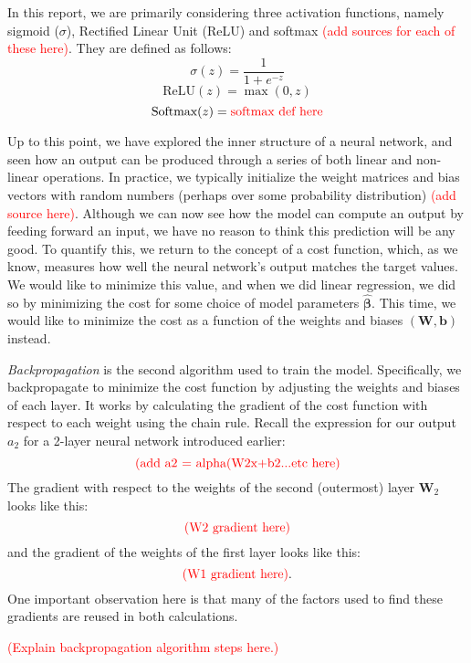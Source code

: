 In this report, we are primarily considering three activation functions, namely sigmoid ($\sigma$), Rectified Linear Unit (ReLU) and softmax \textcolor{red}{(add sources for each of these here)}. They are defined as follows:
\[\sigma(z) = \frac{1}{1 + e^{-z}}\]
\[\text{ReLU}(z) = \max(0, z)\]
\[\text{Softmax}(z) = \text{\textcolor{red}{softmax def here}}\]

Up to this point, we have explored the inner structure of a neural network, and seen how an output can be produced through a series of both linear and non-linear operations. In practice, we typically initialize the weight matrices and bias vectors with random numbers (perhaps over some probability distribution) \textcolor{red}{(add source here)}. Although we can now see how the model can compute an output by feeding forward an input, we have no reason to think this prediction will be any good. To quantify this, we return to the concept of a cost function, which, as we know, measures how well the neural network's output matches the target values. We would like to minimize this value, and when we did linear regression, we did so by minimizing the cost for some choice of model parameters $\boldsymbol{\hat{\beta}}$. This time, we would like to minimize the cost as a function of the weights and biases $(\mathbf{W}, \boldsymbol b)$ instead. 

\emph{Backpropagation} is the second algorithm used to train the model. Specifically, we backpropagate to minimize the cost function by adjusting the weights and biases of each layer. It works by calculating the gradient of the cost function with respect to each weight using the chain rule. Recall the expression for our output $a_2$ for a 2-layer neural network introduced earlier:
\[\text{\textcolor{red}{(add a2 = alpha(W2x+b2...etc here)}}\]
The gradient with respect to the weights of the second (outermost) layer $\mathbf W_2$ looks like this:
\[\text{\textcolor{red}{(W2 gradient here)}}\]
and the gradient of the weights of the first layer looks like this:
\[\text{\textcolor{red}{(W1 gradient here)}}.\]
One important observation here is that many of the factors used to find these gradients are reused in both calculations. 

\textcolor{red}{(Explain backpropagation algorithm steps here.)}

